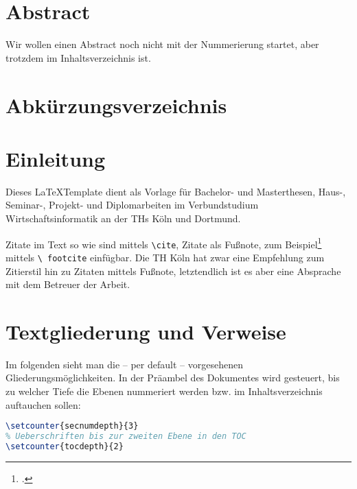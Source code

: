 \documentclass[12pt,oneside,a4paper,bibtotoc,liststotoc]{scrreprt}
\begin{document}
\tableofcontents

\onehalfspacing %

\chapter*{Abstract}

Wir wollen einen Abstract noch nicht mit der Nummerierung startet, aber trotzdem im Inhaltsverzeichnis ist.

\listoffigures

\listoftables

\lstlistoflistings

\chapter*{Abkürzungsverzeichnis}
\begin{acronym}[Thesis]

\end{acronym}


\chapter{Einleitung}

Dieses \LaTeX Template dient als Vorlage für Bachelor- und
Masterthesen, Haus-, Seminar-, Projekt- und Diplomarbeiten im
Verbundstudium Wirtschaftsinformatik an der \acp{TH} Köln und
Dortmund.

Zitate im Text so wie \cite[vgl.][S.~1]{Lamport} sind mittels
\texttt{\textbackslash cite}, Zitate als Fußnote, zum
Beispiel\footcite[vgl.][S.~1]{Lamport} mittels \texttt{\textbackslash
  footcite} einfügbar. Die \ac{TH} Köln hat zwar eine Empfehlung zum
Zitierstil hin zu Zitaten mittels Fußnote, letztendlich ist es aber
eine Absprache mit dem Betreuer der Arbeit.

\chapter{Textgliederung und Verweise}

Im folgenden sieht man die -- per default -- vorgesehenen
Gliederungsmöglichkeiten. In der Präambel des Dokumentes wird
gesteuert, bis zu welcher Tiefe die Ebenen nummeriert werden bzw. im
Inhaltsverzeichnis auftauchen sollen:

\begin{lstlisting}[language=TeX,caption=Steuerung der
  Nummerierungstiefe und Inhaltsverzeichnistiefe in der
  Prämbel,label=praeambel_tiefe]
% Ueberschriften bis zur dritten Ebene durchnummerieren
\setcounter{secnumdepth}{3}
% Ueberschriften bis zur zweiten Ebene in den TOC
\setcounter{tocdepth}{2}
\end{lstlisting}
\end{document}
